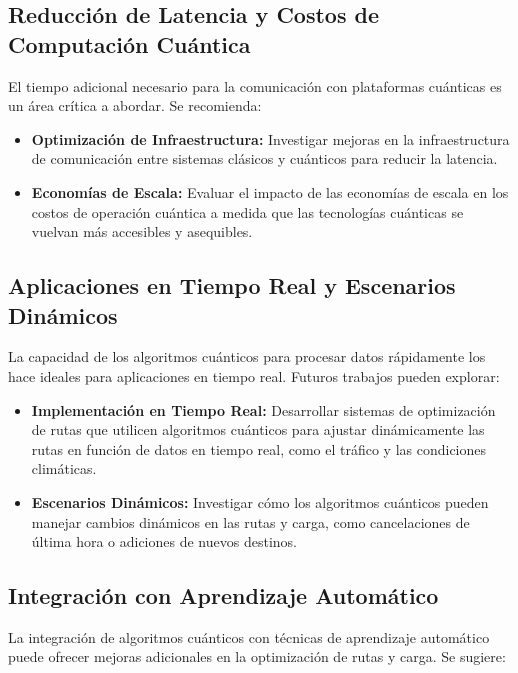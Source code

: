 \documentclass[11pt,a4paper,spanish]{book}
\begin{document}
\subsection{Reducción de Latencia y Costos de Computación Cuántica}

El tiempo adicional necesario para la comunicación con plataformas cuánticas es un área crítica a abordar. Se recomienda:

\begin{itemize}
    \item \textbf{Optimización de Infraestructura:} Investigar mejoras en la infraestructura de comunicación entre sistemas clásicos y cuánticos para reducir la latencia.
    \item \textbf{Economías de Escala:} Evaluar el impacto de las economías de escala en los costos de operación cuántica a medida que las tecnologías cuánticas se vuelvan más accesibles y asequibles.
\end{itemize}

\subsection{Aplicaciones en Tiempo Real y Escenarios Dinámicos}

La capacidad de los algoritmos cuánticos para procesar datos rápidamente los hace ideales para aplicaciones en tiempo real. Futuros trabajos pueden explorar:

\begin{itemize}
    \item \textbf{Implementación en Tiempo Real:} Desarrollar sistemas de optimización de rutas que utilicen algoritmos cuánticos para ajustar dinámicamente las rutas en función de datos en tiempo real, como el tráfico y las condiciones climáticas.
    \item \textbf{Escenarios Dinámicos:} Investigar cómo los algoritmos cuánticos pueden manejar cambios dinámicos en las rutas y carga, como cancelaciones de última hora o adiciones de nuevos destinos.
\end{itemize}

\subsection{Integración con Aprendizaje Automático}

La integración de algoritmos cuánticos con técnicas de aprendizaje automático puede ofrecer mejoras adicionales en la optimización de rutas y carga. Se sugiere:
\end{document}
